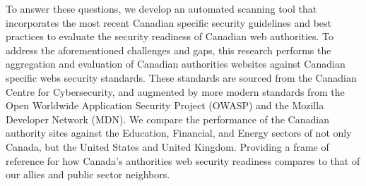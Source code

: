 \documentclass[pdflatex,sn-mathphys-num]{sn-jnl}
\numberwithin{equation}{section}
\theoremstyle{thmstyleone}
\theoremstyle{thmstyletwo}%
\theoremstyle{thmstylethree}%
\begin{document}
%
%





\vspace{1em}To answer these questions, we develop an automated scanning tool that incorporates the most 
recent Canadian specific security guidelines and best practices to evaluate the security 
readiness of Canadian web authorities. To address the aforementioned challenges and gaps, this research 
performs the aggregation and evaluation of Canadian authorities websites against Canadian specific webs security 
standards. These standards are sourced from the Canadian Centre for Cybersecurity, and augmented
by more modern standards from the Open Worldwide Application Security Project (OWASP) and the 
Mozilla Developer Network (MDN). 
We compare the performance of the Canadian authority sites against the 
Education, Financial, and Energy sectors of not only Canada, but the United States and United 
Kingdom. Providing a frame of reference for how Canada's authorities web security readiness compares
to that of our allies and public sector neighbors.
\end{document}

